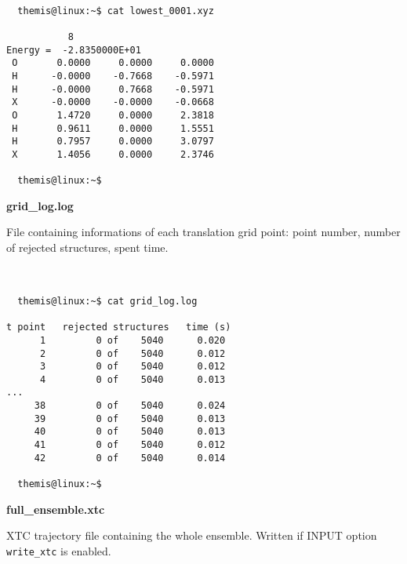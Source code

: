 \documentclass{achemso}
\begin{document}
\begin{center}
  \begin{minipage}{0.4\textwidth}
    \begin{verbatim}

  themis@linux:~$ cat lowest_0001.xyz

           8
Energy =  -2.8350000E+01
 O       0.0000     0.0000     0.0000
 H      -0.0000    -0.7668    -0.5971
 H      -0.0000     0.7668    -0.5971
 X      -0.0000    -0.0000    -0.0668
 O       1.4720     0.0000     2.3818
 H       0.9611     0.0000     1.5551
 H       0.7957     0.0000     3.0797
 X       1.4056     0.0000     2.3746

  themis@linux:~$ 

    \end{verbatim}
    \vskip0.25cm
  \end{minipage}%
\end{center}


\textbf{grid\_log.log}

  File containing informations of each translation grid point: point number,
number of rejected structures, spent time. \\~

\begin{center}
  \begin{minipage}{0.4\textwidth}
    \begin{verbatim}

  themis@linux:~$ cat grid_log.log

t point   rejected structures   time (s)
      1         0 of    5040      0.020
      2         0 of    5040      0.012
      3         0 of    5040      0.012
      4         0 of    5040      0.013
...
     38         0 of    5040      0.024
     39         0 of    5040      0.013
     40         0 of    5040      0.013
     41         0 of    5040      0.012
     42         0 of    5040      0.014

  themis@linux:~$ 

    \end{verbatim}
    \vskip0.25cm
  \end{minipage}%
\end{center}

\textbf{full\_ensemble.xtc}

  XTC trajectory file containing the whole ensemble. Written if INPUT option
  \texttt{write\_xtc} is enabled. \\~
\end{document}
